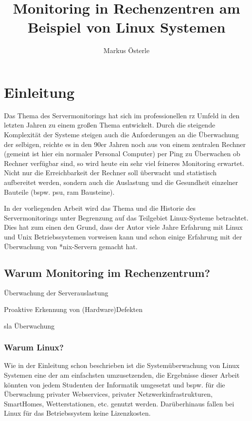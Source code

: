\documentclass[12pt,a4paper,parskip]{scrreprt}
\author{Markus Österle}
\title{Monitoring in Rechenzentren am Beispiel von Linux Systemen}
\date{} %
\begin{document}
	\maketitle
	\setcounter{tocdepth}{3}
	\tableofcontents
	\onehalfspacing
	\chapter{Einleitung}
Das Thema des Servermonitorings hat sich im professionellen \acrshort{rz} Umfeld in den letzten Jahren zu einem großen Thema entwickelt. Durch die steigende Komplexität der Systeme steigen auch die Anforderungen an die Überwachung der selbigen, reichte es in den 90er Jahren noch aus von einem zentralen Rechner (gemeint ist hier ein normaler Personal Computer) per Ping zu Überwachen ob Rechner verfügbar sind, so wird heute ein sehr viel feineres Monitoring erwartet. Nicht nur die Erreichbarkeit der Rechner soll überwacht und statistisch aufbereitet werden, sondern auch die Auslastung und die Gesundheit einzelner Bauteile (bspw. \gls{psu}, \acrshort{ram} Bausteine). 

In der vorliegenden Arbeit wird das Thema und die Historie des Servermonitorings unter Begrenzung auf das Teilgebiet Linux-Systeme betrachtet. Dies hat zum einen den Grund, dass der Autor viele Jahre Erfahrung mit Linux und Unix Betriebssystemen vorweisen kann und schon einige Erfahrung mit der Überwachung von *nix-Servern gemacht hat.
	\section{Warum Monitoring im Rechenzentrum?}
	
		Überwachung der Serverauslastung
		
		Proaktive Erkennung von (Hardware)Defekten
		
		\gls{sla} Überwachung
		\subsection{Warum Linux?}
		Wie in der Einleitung schon beschrieben ist die Systemüberwachung von Linux Systemen eine der am einfachsten umzusetzenden, die Ergebnisse dieser Arbeit könnten von jedem Studenten der Informatik umgesetzt und bspw. für die Überwachung privater Webservices, privater Netzwerkinfrastrukturen, SmartHomes, Wetterstationen, etc. genutzt werden. Darüberhinaus fallen bei Linux für das Betriebssystem keine Lizenzkosten.
	
\end{document}
